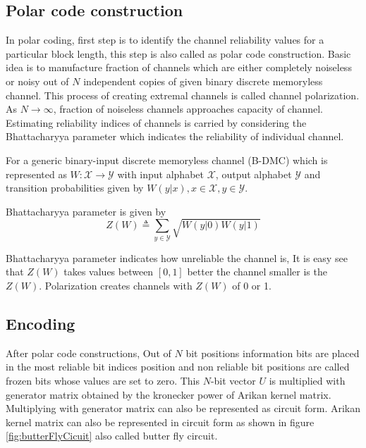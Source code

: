 \subsection{Polar code construction} \label{CodeConstruction}
In polar coding, first step is to identify the channel reliability values for a particular block length, this step is also called as polar code construction. Basic idea  is to manufacture fraction of channels which are either completely noiseless or noisy out of $N$ independent copies of given binary discrete memoryless channel. This process of creating extremal channels is called channel polarization. As $N\to\infty$, fraction of noiseless channels approaches capacity of channel. Estimating reliability indices of channels is carried by considering the Bhattacharyya parameter which indicates the reliability of individual channel.
 
For a generic binary-input discrete memoryless channel (B-DMC) which is represented as $W \colon \mathcal{X} \to \mathcal{Y}$ with input alphabet $\mathcal{X}$, output alphabet $\mathcal{Y}$ and transition probabilities given by $W(y|x),x \in \mathcal{X}, y \in \mathcal{Y}$.

Bhattacharyya parameter is given by 
\begin{equation}
	Z(W) \triangleq \sum_{y \in \mathcal{Y}} \sqrt{W(y|0)W(y|1)}
\end{equation}

Bhattacharyya parameter indicates how unreliable the channel is, It is easy see that $Z(W)$ takes values between $[0,1]$ better the channel smaller is the $Z(W)$. Polarization creates channels with $Z(W)$ of 0 or 1.



\subsection{Encoding} \label{polarEncoding}
After polar code constructions, Out of $N$ bit positions information bits are placed in the most reliable bit indices position and non reliable bit positions are called frozen bits whose values are set to zero. This $N$-bit vector $U$ is multiplied with generator matrix obtained by the kronecker power of Arikan kernel matrix. Multiplying with generator matrix can also be represented as circuit form. Arikan kernel matrix can also be represented in circuit form as shown in figure \ref{fig:butterFlyCicuit} also called butter fly circuit.

